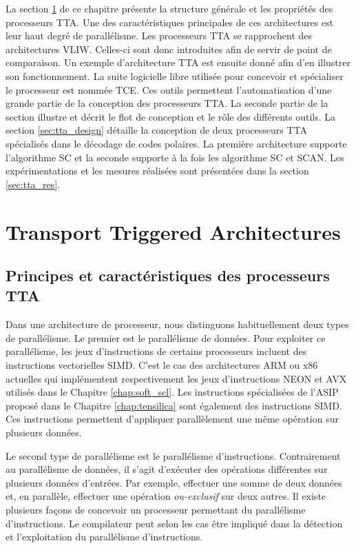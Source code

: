 La section \ref{sec:tta_description} de ce chapitre présente la structure générale et les propriétés des processeurs TTA. Une des caractéristiques principales de ces architectures est leur haut degré de parallélisme. Les processeurs TTA se rapprochent des architectures VLIW. Celles-ci sont donc introduites afin de servir de point de comparaison. Un exemple d'architecture TTA est ensuite donné afin d'en illustrer son fonctionnement. La suite logicielle libre utilisée pour concevoir et spécialiser le processeur est nommée TCE. Ces outils permettent l'automatisation d'une grande partie de la conception des processeurs TTA. La seconde partie de la section illustre et décrit le flot de conception et le rôle des différents outils. La section \ref{sec:tta_design} détaille la conception de deux processeurs TTA spécialisés dans le décodage de codes polaires. La première architecture supporte l'algorithme SC et la seconde supporte à la fois les algorithme SC et SCAN. Les expérimentations et les mesures réalisées sont présentées dans la section \ref{sec:tta_res}.

\section{Transport Triggered Architectures}
\label{sec:tta_description}

\subsection{Principes et caractéristiques des processeurs TTA}

Dans une architecture de processeur, nous distinguons habituellement deux types de parallélisme.
Le premier est le parallélisme de données.
Pour exploiter ce parallélisme, les jeux d'instructions de certains processeurs incluent des instructions vectorielles SIMD.
C'est le cas des architectures ARM ou x86 actuelles qui implémentent respectivement les jeux d'instructions NEON et AVX utilisés dans le Chapitre \ref{chap:soft_scl}.
Les instructions spécialisées de l'ASIP proposé dans le Chapitre \ref{chap:tensilica} sont également des instructions SIMD.
Ces instructions permettent d'appliquer parallèlement une même opération sur plusieurs données.

Le second type de parallélisme est le parallélisme d'instructions. Contrairement au parallélisme de données, il s'agit d'exécuter des opérations différentes sur plusieurs données d'entrées. Par exemple, effectuer une somme de deux données et, en parallèle, effectuer une opération \textit{ou-exclusif} sur deux autres.
Il existe plusieurs façons de concevoir un processeur permettant du parallélisme d'instructions. Le compilateur peut selon les cas être impliqué dans la détection et l'exploitation du parallélisme d'instructions.

